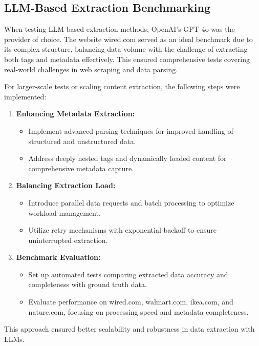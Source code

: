 \subsection{LLM-Based Extraction Benchmarking}

When testing LLM-based extraction methods, OpenAI's GPT-4o was the provider of choice. The website wired.com served as an ideal benchmark due to its complex structure, balancing data volume with the challenge of extracting both tags and metadata effectively. This ensured comprehensive tests covering real-world challenges in web scraping and data parsing.

For larger-scale tests or scaling content extraction, the following steps were implemented:

\begin{enumerate}
    \item \textbf{Enhancing Metadata Extraction:}
    \begin{itemize}
        \item Implement advanced parsing techniques for improved handling of structured and unstructured data.
        \item Address deeply nested tags and dynamically loaded content for comprehensive metadata capture.
    \end{itemize}
    
    \item \textbf{Balancing Extraction Load:}
    \begin{itemize}
        \item Introduce parallel data requests and batch processing to optimize workload management.
        \item Utilize retry mechanisms with exponential backoff to ensure uninterrupted extraction.
    \end{itemize}
    
    \item \textbf{Benchmark Evaluation:}
    \begin{itemize}
        \item Set up automated tests comparing extracted data accuracy and completeness with ground truth data.
        \item Evaluate performance on wired.com, walmart.com, ikea.com, and nature.com, focusing on processing speed and metadata completeness.
    \end{itemize}
\end{enumerate}

This approach ensured better scalability and robustness in data extraction with LLMs.

